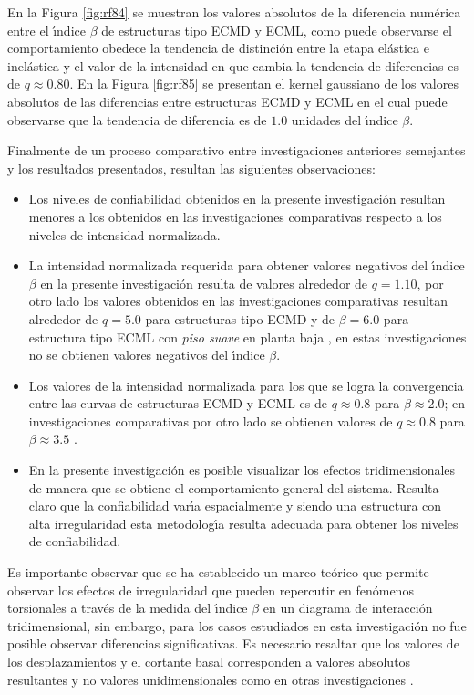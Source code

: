 En la Figura \ref{fig:rf84} se muestran los valores absolutos de la diferencia num\'erica entre el \'{\i}ndice $\beta$ de estructuras tipo ECMD y ECML, como puede observarse el comportamiento obedece la tendencia de distinci\'on entre la etapa el\'astica e inel\'astica y el valor de la intensidad en que cambia la tendencia de diferencias es de $q\approx 0.80$. En la Figura \ref{fig:rf85} se presentan el kernel gaussiano de los valores absolutos de las diferencias entre estructuras ECMD y ECML en el cual puede observarse que la tendencia de diferencia es de $1.0$ unidades del \'{\i}ndice $\beta$.

 Finalmente de un proceso comparativo entre investigaciones anteriores \cite{D2008, Put2010, PE2012} semejantes y los resultados presentados, resultan las siguientes observaciones:

\begin{itemize}
	\item Los niveles de confiabilidad obtenidos en la presente investigaci\'on resultan menores a los obtenidos en las investigaciones comparativas \cite{D2008,Put2010} respecto a los niveles de intensidad normalizada.
	\item La intensidad normalizada requerida para obtener valores negativos del \'{\i}ndice $\beta$ en la presente investigaci\'on resulta de valores alrededor de $q=1.10$, por otro lado los valores obtenidos en las investigaciones comparativas resultan alrededor de $q=5.0$ para estructuras tipo ECMD y de $\beta=6.0$ para estructura tipo ECML con \emph{piso suave} en planta baja \cite{Put2010}, en estas investigaciones no se obtienen valores negativos del \'{\i}ndice $\beta$.
	\item Los valores de la intensidad normalizada para los que se logra la convergencia entre las curvas de estructuras ECMD y ECML es de $q \approx 0.8$ para $\beta \approx 2.0$; en investigaciones comparativas por otro lado se obtienen valores de $q \approx 0.8$ para $\beta \approx 3.5$ \cite{Put2010}.	
	\item En la presente investigaci\'on es posible visualizar los efectos tridimensionales de manera que se obtiene el comportamiento general del sistema.  Resulta claro que la confiabilidad var\'{\i}a espacialmente y siendo una estructura con alta irregularidad esta metodolog\'{\i}a resulta adecuada para obtener los niveles de confiabilidad.
\end{itemize}

Es importante observar que se ha establecido un marco te\'orico que permite observar los efectos de irregularidad que pueden repercutir en fen\'omenos torsionales a trav\'es de la medida del \'{\i}ndice $\beta$ en un diagrama de interacci\'on tridimensional, sin embargo, para los casos estudiados en esta investigaci\'on no fue posible observar diferencias significativas. Es necesario resaltar que los valores de los desplazamientos y el cortante basal corresponden a valores absolutos resultantes y no valores unidimensionales como en otras investigaciones \cite{D2008, Put2010, PE2012}.

